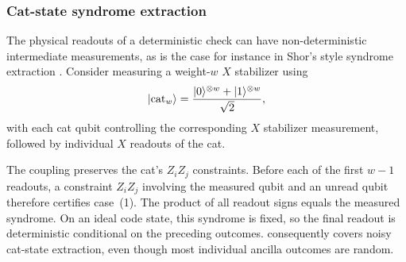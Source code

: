 \subsubsection{Cat-state syndrome extraction}

The physical readouts of a deterministic check can have non-deterministic intermediate measurements, as is the case for instance in Shor's style syndrome extraction \cite{gottesman2009introduction, shor1997faulttolerant}. Consider measuring a weight-$w$
$X$ stabilizer using
\begin{align}
    |\mathrm{cat}_w\rangle
    =\frac{|0\rangle^{\otimes w}+|1\rangle^{\otimes w}}{\sqrt{2}},
\end{align}
with each cat qubit controlling the corresponding $X$ stabilizer measurement, followed by individual $X$ readouts of the cat.

The coupling preserves the cat's $Z_iZ_j$ constraints.
Before each of the first $w-1$ readouts, a constraint
$Z_iZ_j$ involving the measured qubit and an unread qubit
therefore certifies case~(1). The product of all readout
signs equals the measured syndrome. On an ideal code state,
this syndrome is fixed, so the final readout is
deterministic conditional on the preceding outcomes.
 consequently covers noisy cat-state extraction,
even though most individual ancilla outcomes are random.
